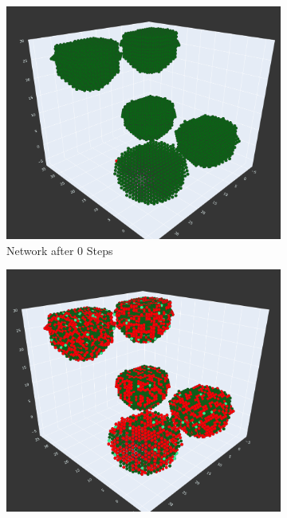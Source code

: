 \begin{figure}
    \centering
    \begin{subfigure}[b]{0.475\textwidth}
        \centering
        \includegraphics[width=\textwidth]{images/oscillation0.png}
        \caption[Network2]%
        {{\small Network after 0 Steps \newline}}    
        \label{fig:mean and std of net14}
    \end{subfigure}
    \hfill
    \begin{subfigure}[b]{0.475\textwidth}  
        \centering 
        \includegraphics[width=\textwidth]{images/oscillation12.png}

\end{subfigure}
\end{figure}
